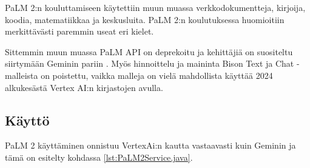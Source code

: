 PaLM 2:n kouluttamiseen käytettiin muun muassa verkkodokumentteja, kirjoija,
koodia, matematiikkaa ja keskusluita. PaLM 2:n koulutuksessa huomioitiin
merkittävästi paremmin useat eri kielet. \parencite{googlePaLM2TechReport}

Sittemmin muun muassa PaLM API on deprekoitu ja kehittäjiä on suositeltu
siirtymään Geminin pariin \parencite{googlePaLMAPIDeprecated}. Myös hinnoittelu
ja maininta Bison Text ja Chat -malleista on poistettu, vaikka malleja on vielä
mahdollista käyttää 2024 alkukesästä Vertex AI:n kirjastojen avulla.

\subsection{Käyttö}

PaLM 2 käyttäminen onnistuu VertexAi:n kautta vastaavasti kuin Geminin ja
tämä on esitelty kohdassa \ref{lst:PaLM2Service.java}.

